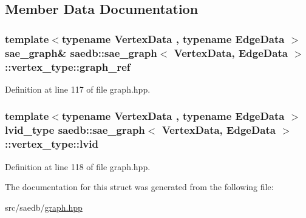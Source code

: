 \subsection{Member Data Documentation}
\hypertarget{structsaedb_1_1sae__graph_1_1vertex__type_a5977862a541ff4fe90999fbf49d287dd}{
\subsubsection[{graph\-\_\-ref}]{\setlength{\rightskip}{0pt plus 5cm}template$<$typename Vertex\-Data , typename Edge\-Data $>$ {\bf sae\-\_\-graph}\& {\bf saedb\-::sae\-\_\-graph}$<$ Vertex\-Data, Edge\-Data $>$\-::vertex\-\_\-type\-::graph\-\_\-ref}}\label{d1/d90/structsaedb_1_1sae__graph_1_1vertex__type_a5977862a541ff4fe90999fbf49d287dd}


Definition at line 117 of file graph.\-hpp.

\hypertarget{structsaedb_1_1sae__graph_1_1vertex__type_a580dbdb1a1037a94f7ee66d942d679cc}{
\subsubsection[{lvid}]{\setlength{\rightskip}{0pt plus 5cm}template$<$typename Vertex\-Data , typename Edge\-Data $>$ {\bf lvid\-\_\-type} {\bf saedb\-::sae\-\_\-graph}$<$ Vertex\-Data, Edge\-Data $>$\-::vertex\-\_\-type\-::lvid}}\label{d1/d90/structsaedb_1_1sae__graph_1_1vertex__type_a580dbdb1a1037a94f7ee66d942d679cc}


Definition at line 118 of file graph.\-hpp.



The documentation for this struct was generated from the following file\-:\begin{DoxyCompactItemize}
\item 
src/saedb/\hyperlink{graph_8hpp}{graph.\-hpp}\end{DoxyCompactItemize}
